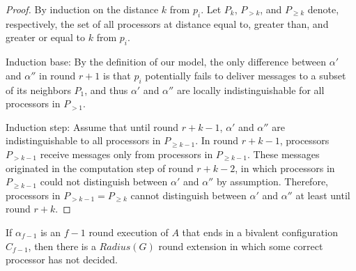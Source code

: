 \begin{proof}
By induction on the distance $k$ from $p_i$. Let $P_k$, $P_{>k}$, and $P_{\geq k}$ denote,
respectively, the set of all processors at distance equal to, greater than, and
greater or equal to $k$ from $p_i$.

Induction base: By the definition of our model, the only difference 
between $\alpha'$ and $\alpha''$ in round $r+1$ is that $p_i$ potentially fails
to deliver messages to a subset of its neighbors $P_1$, and thus $\alpha'$ and $\alpha''$
are locally indistinguishable for all processors in $P_{>1}$.

Induction step: Assume that until round $r+k-1$, $\alpha'$ and $\alpha''$ are
indistinguishable to all processors in $P_{\geq k-1}$. In round $r+k-1$, processors
$P_{>k-1}$ receive messages only from processors in $P_{\geq k-1}$. These messages
originated in the computation step of round $r+k-2$, in which processors in $P_{\geq k-1}$
could not distinguish between $\alpha'$ and $\alpha''$ by assumption.
Therefore, processors in $P_{>k-1} = P_{\geq k}$ cannot distinguish between
$\alpha'$ and $\alpha''$ at least until round $r+k$.
\end{proof}


\begin{lemma}
If $\alpha_{f-1}$ is an $f-1$ round execution of $A$ that ends in a bivalent
configuration $C_{f-1}$, then there is a $Radius(G)$ round extension in which
some correct processor has not decided.
\end{lemma}

